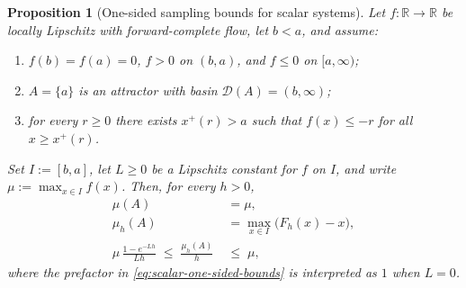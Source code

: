 \documentclass[pdflatex,sn-mathphys-num]{sn-jnl}
\numberwithin{equation}{section}
\theoremstyle{thmstyleone}%
\newtheorem{proposition}[theorem]{Proposition}
\theoremstyle{definition}
\theoremstyle{remark}
\begin{document}
\begin{proposition}[One-sided sampling bounds for scalar systems]
\label{prop:scalar-one-sided}
Let $f:\mathbb R\to\mathbb R$ be locally Lipschitz with forward-complete
flow, let $b<a$, and assume:
\begin{enumerate}
\item $f(b)=f(a)=0$, $f>0$ on $(b,a)$, and $f\leq0$ on $[a,\infty)$;
\item $A=\{a\}$ is an attractor with basin
$\mathcal D(A)=(b,\infty)$;
\item for every $r\geq0$ there exists $x^+(r)>a$ such that
$f(x)\leq-r$ for all $x\geq x^+(r)$.
\end{enumerate}
Set $I:=[b,a]$, let $L\geq0$ be a Lipschitz constant for $f$ on $I$,
and write
    $\mu:=\max_{x\in I}f(x)$.
Then, for every $h>0$,
\begin{align}
\label{eq:scalar-one-sided-continuous}
    \mu(A)&=\mu,\\
\label{eq:scalar-one-sided-discrete}
    \mu_h(A)&=\max_{x\in I}\bigl(F_h(x)-x\bigr),\\
\label{eq:scalar-one-sided-bounds}
    \mu\,\frac{1-e^{-Lh}}{Lh}
    \;\leq\;
    \frac{\mu_h(A)}{h}
    \;&\leq\;
    \mu,
\end{align}
where the prefactor in \eqref{eq:scalar-one-sided-bounds} is
interpreted as $1$ when $L=0$.
\end{proposition}
\end{document}

